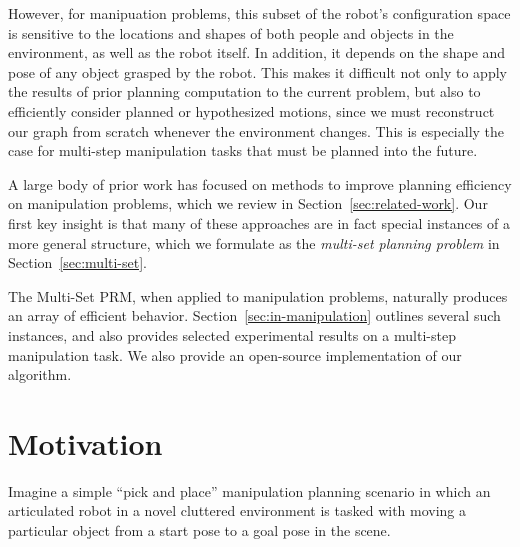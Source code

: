 However,
for manipuation problems,
this subset of the robot's configuration space
is sensitive to the locations and shapes of
both people and objects in the environment,
as well as the robot itself.
In addition, it depends on the shape and pose of any object
grasped by the robot.
This makes it difficult not only to apply the results of prior
planning computation to the current problem,
but also to efficiently consider planned or hypothesized motions,
since we must reconstruct our graph from scratch whenever
the environment changes.
This is especially the case for
multi-step manipulation tasks that must be planned into the future.

A large body of prior work has focused on methods to
improve planning efficiency on manipulation problems,
which we review in Section~\ref{sec:related-work}.
Our first key insight is that many of these approaches are
in fact special instances of a more general structure,
which we formulate as the \emph{multi-set planning problem}
in Section~\ref{sec:multi-set}.

The Multi-Set PRM,
when applied to manipulation problems,
naturally produces an array of efficient behavior.
Section~\ref{sec:in-manipulation} outlines several such instances,
and also provides selected experimental results
on a multi-step manipulation task.
We also provide an open-source implementation of our algorithm.

\section{Motivation}

Imagine a simple ``pick and place'' manipulation planning scenario
in which an articulated robot in a novel cluttered environment
is tasked with moving a particular object from a start pose to a goal
pose in the scene.

